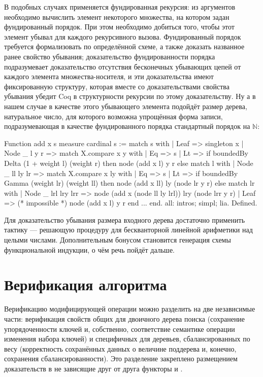 \documentclass[a4paper,14pt]{extarticle}
\begin{document}
В подобных случаях применяется фундированная рекурсия:
из аргументов необходимо вычислить элемент некоторого множества, на котором
задан фундированный порядок. При этом необходимо добиться того, чтобы этот
элемент убывал для каждого рекурсивного вызова. Фундированный порядок требуется
формализовать по определённой схеме, а также доказать названное ранее свойство
убывания; доказательство фундированности порядка подразумевает доказательство
отсутствия бесконечных убывающих цепей от каждого элемента множества-носителя, и
эти доказательства имеют фиксированную структуру, которая вместе со
доказательствами свойства убывания убедит Coq в структурности рекурсии по этому
доказательству. Ну а в нашем случае в качестве этого убывающего элемента
подойдёт размер дерева, натуральное число, для которого возможна упрощённая
форма записи, подразумевающая в качестве фундированного порядка стандартный
порядок на \( \mathbb{N} \):

\begin{coqcode}

Function add x s {measure cardinal s} := match s with
| Leaf => singleton x
| Node _ l y r =>
  match X.compare x y with
  | Eq => s
  | Lt =>
    if boundedBy Delta (1 + weight l) (weight r)
    then node (add x l) y r
    else match l with
    | Node _ ll ly lr =>
      match X.compare x ly with
      | Eq => s
      | Lt =>
        if boundedBy Gamma (weight lr) (weight ll)
        then node (add x ll) ly (node lr y r)
        else match lr with
        | Node _ lrl lry lrr =>
          node (add x (node ll ly lrl)) lry (node lrr y r)
        | Leaf => (* impossible *) node (add x l) y r
        end
      ...
end.
all: intros; simpl; lia. Defined.

\end{coqcode}

Для доказательство убывания размера входного дерева
достаточно применить тактику  ---
решающую процедуру для бескванторной линейной арифметики
над целыми числами\cite{micromega}.
Дополнительным бонусом становится генерация схемы функциональной
индукции, о чём речь пойдёт дальше.

\clearpage
\section{Верификация алгоритма}

Верификацию модифицирующей операции можно разделить
на две независимые части:
верификация свойств общих для двоичного дерева поиска
(сохранение упорядоченности ключей и, собственно,
соответствие семантике операции изменения набора ключей)
и специфичных для деревьев, сбалансированных по весу
(корректность сохранённых данных о величине поддерева
и, конечно, сохранения сбалансированности).
Это разделение закреплено размещением
доказательств в не зависящие друг от друга функторы
 и .
\end{document}
